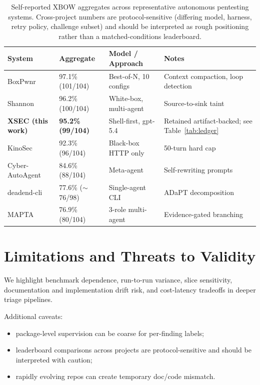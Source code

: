 \documentclass[11pt]{article}
\begin{document}
\begin{table}[ht]
\centering
\small
\begin{tabular}{llll}
\toprule
System & Aggregate & Model / Approach & Notes \\
\midrule
BoxPwnr\citep{boxpwnr}             & 97.1\% (101/104) & Best-of-N, 10 configs  & Context compaction, loop detection \\
Shannon\citep{shannon}              & 96.2\% (100/104) & White-box, multi-agent & Source-to-sink taint \\
\textbf{XSEC (this work)}         & \textbf{95.2\% (99/104)} & Shell-first, gpt-5.4   & Retained artifact-backed; see Table~\ref{tab:ledger} \\
KinoSec\citep{kinosec}              & 92.3\% (96/104)  & Black-box HTTP only    & 50-turn hard cap \\
Cyber-AutoAgent\citep{cyberautoagent} & 84.6\% (88/104)  & Meta-agent             & Self-rewriting prompts \\
deadend-cli\citep{deadend}          & 77.6\% ($\sim$76/98) & Single-agent CLI     & ADaPT decomposition \\
MAPTA\citep{mapta}                  & 76.9\% (80/104)  & 3-role multi-agent     & Evidence-gated branching \\
\bottomrule
\end{tabular}
\caption{Self-reported XBOW aggregates across representative autonomous pentesting systems. Cross-project numbers are protocol-sensitive (differing model, harness, retry policy, challenge subset) and should be interpreted as rough positioning rather than a matched-conditions leaderboard.}
\label{tab:competitors}
\end{table}

\section{Limitations and Threats to Validity}

We highlight benchmark dependence, run-to-run variance, slice sensitivity,
documentation and implementation drift risk, and cost-latency tradeoffs in deeper
triage pipelines.

Additional caveats:
\begin{itemize}
  \item package-level supervision can be coarse for per-finding labels;
  \item leaderboard comparisons across projects are protocol-sensitive and
  should be interpreted with caution;
  \item rapidly evolving repos can create temporary doc/code mismatch.
\end{itemize}
\end{document}
